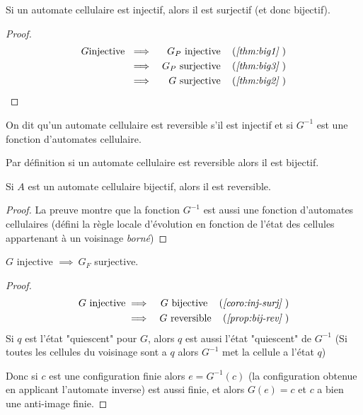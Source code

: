 \begin{coro} \label{coro:inj-surj}
	Si un automate cellulaire est injectif, alors il est surjectif (et donc bijectif).
\end{coro}

\begin{proof}
	\begin{eqnarray*}
		G \text{injective } &\implies& G_P \text{ injective} \quad\left(\textit{\ref{thm:big1} }\right) \\
		&\implies& G_P \text{ surjective} \quad\left(\textit{\ref{thm:big3} }\right) \\
		&\implies& G \text{ surjective} \quad\left(\textit{\ref{thm:big2} }\right)
	\end{eqnarray*}
\end{proof}


\begin{definition}
	On dit qu'un automate cellulaire est reversible s'il est injectif et si $G^{-1}$ est une fonction d'automates cellulaire.
\end{definition}

\begin{remarque}
	Par définition si un automate cellulaire est reversible alors il est bijectif.
\end{remarque}

\begin{prop}\label{prop:bij-rev}
	Si $A$ est un automate cellulaire bijectif, alors il est reversible.
\end{prop}

\begin{proof}
	La preuve montre que la fonction $G^{-1}$ est aussi une fonction d'automates cellulaires
	(défini la règle locale d'évolution en fonction de l'état des cellules appartenant à un voisinage \emph{borné})
\end{proof}

\begin{coro}
	$G$ injective $\implies \ G_F$ surjective.
\end{coro}


\begin{proof}
	\begin{eqnarray*}
		G \text{ injective} &\implies& G \text{ bijective} \quad\left(\textit{\ref{coro:inj-surj} }\right)\\
		&\implies& G \text{ reversible} \quad\left(\textit{\ref{prop:bij-rev} }\right)
	\end{eqnarray*}
	Si $q$ est l'état "quiescent" pour $G$, alors $q$ est aussi l'état "quiescent" de $G^{-1}$
	(Si toutes les cellules du voisinage sont a $q$ alors $G^{-1}$ met la cellule a l'état $q$)

	Donc si $c$ est une configuration finie alors $e = G^{-1}(c)$ (la configuration obtenue en applicant
	l'automate inverse) est aussi finie, et alors $G(e) = c$ et $c$ a bien une anti-image finie.
\end{proof}

